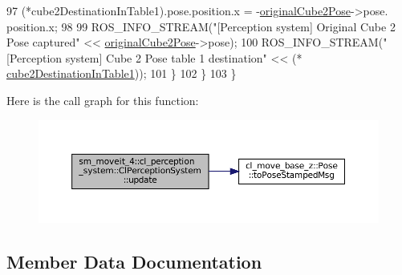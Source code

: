 \begin{DoxyCode}
97                 (*cube2DestinationInTable1).pose.position.x = -\hyperlink{classsm__moveit__4_1_1cl__perception__system_1_1ClPerceptionSystem_acdec54d806d67e1452767cc246760267}{originalCube2Pose}->pose.
      position.x;
98 
99                 ROS\_INFO\_STREAM(\textcolor{stringliteral}{"[Perception system] Original Cube 2 Pose captured"} << 
      \hyperlink{classsm__moveit__4_1_1cl__perception__system_1_1ClPerceptionSystem_acdec54d806d67e1452767cc246760267}{originalCube2Pose}->pose);
100                 ROS\_INFO\_STREAM(\textcolor{stringliteral}{"[Perception system] Cube 2 Pose table 1 destination"} << (*
      \hyperlink{classsm__moveit__4_1_1cl__perception__system_1_1ClPerceptionSystem_a3be34a534f5bb76c7ea43a7f4dcb324e}{cube2DestinationInTable1}));
101             \}
102         \}
103     \}
\end{DoxyCode}
Here is the call graph for this function\+:
\nopagebreak
\begin{figure}[H]
\begin{center}
\leavevmode
\includegraphics[width=350pt]{classsm__moveit__4_1_1cl__perception__system_1_1ClPerceptionSystem_a91de8cf71c93738f8bcbea388c84a5dd_cgraph}
\end{center}
\end{figure}


\subsection{Member Data Documentation}
\mbox{\label{classsm__moveit__4_1_1cl__perception__system_1_1ClPerceptionSystem_a85778bda89d9d4b741c9b9d066b757c8}} 
